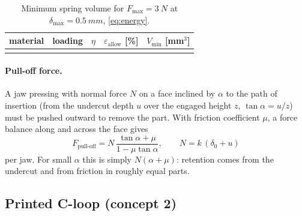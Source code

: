 \begin{table}[H]\centering\small
\caption{Minimum spring volume for $F_\text{max}=\SI{3}{N}$ at $\delta_\text{max}=\SI{0.5}{mm}$, \cref{eq:energy}.}\label{tab:energy}
\begin{tabular}{l l S[table-format=1.2] S[table-format=2.1] S[table-format=2.0]}
\toprule
material & loading & {$\eta$} & {$\varepsilon_\text{allow}$ [\%]} & {$V_\text{min}$ [mm$^3$]}\\
\midrule
{}
\bottomrule
\end{tabular}
\end{table}

\paragraph{Pull-off force.} A jaw pressing with normal force $N$ on a face inclined by $\alpha$ to
the path of insertion (from the undercut depth $u$ over the engaged height $z$,
$\tan\alpha=u/z$) must be pushed outward to remove the part. With friction coefficient $\mu$, a
force balance along and across the face gives
\begin{equation}
F_\text{pull-off} = N\,\frac{\tan\alpha+\mu}{1-\mu\tan\alpha}, \qquad N = k\,(\delta_0+u)
\label{eq:pulloff}
\end{equation}
per jaw. For small $\alpha$ this is simply $N(\alpha+\mu)$: retention comes from the undercut and
from friction in roughly equal parts.

\subsection{Printed C-loop (concept 2)}\label{sec:loop}

